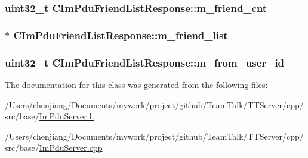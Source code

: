 \subsubsection[{m\+\_\+friend\+\_\+cnt}]{\setlength{\rightskip}{0pt plus 5cm}uint32\+\_\+t C\+Im\+Pdu\+Friend\+List\+Response\+::m\+\_\+friend\+\_\+cnt\hspace{0.3cm}{\ttfamily [private]}}\label{class_c_im_pdu_friend_list_response_a76d16176de9b3bff0d59ff23ff30984e}
\hypertarget{class_c_im_pdu_friend_list_response_a29df15d66b8fc680eef0804a8c8c7f10}{}
\subsubsection[{m\+\_\+friend\+\_\+list}]{$\ast$ C\+Im\+Pdu\+Friend\+List\+Response\+::m\+\_\+friend\+\_\+list\hspace{0.3cm}{\ttfamily [private]}}\label{class_c_im_pdu_friend_list_response_a29df15d66b8fc680eef0804a8c8c7f10}
\hypertarget{class_c_im_pdu_friend_list_response_a2373296c4da86cf2c740a275f35ffa61}{}
\subsubsection[{m\+\_\+from\+\_\+user\+\_\+id}]{\setlength{\rightskip}{0pt plus 5cm}uint32\+\_\+t C\+Im\+Pdu\+Friend\+List\+Response\+::m\+\_\+from\+\_\+user\+\_\+id\hspace{0.3cm}{\ttfamily [private]}}\label{class_c_im_pdu_friend_list_response_a2373296c4da86cf2c740a275f35ffa61}


The documentation for this class was generated from the following files\+:\begin{DoxyCompactItemize}
\item 
/\+Users/chenjiang/\+Documents/mywork/project/github/\+Team\+Talk/\+T\+T\+Server/cpp/src/base/\hyperlink{_im_pdu_server_8h}{Im\+Pdu\+Server.\+h}\item 
/\+Users/chenjiang/\+Documents/mywork/project/github/\+Team\+Talk/\+T\+T\+Server/cpp/src/base/\hyperlink{_im_pdu_server_8cpp}{Im\+Pdu\+Server.\+cpp}\end{DoxyCompactItemize}
